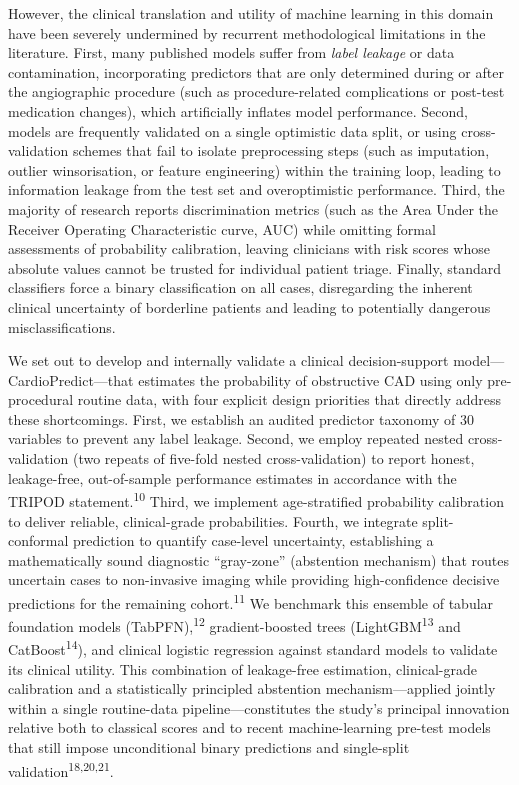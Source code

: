 \documentclass[
  english,
  11pt,
]{article}
\begin{document}
However, the clinical translation and utility of machine learning in this domain have been severely undermined by recurrent methodological limitations in the literature. First, many published models suffer from \emph{label leakage} or data contamination, incorporating predictors that are only determined during or after the angiographic procedure (such as procedure-related complications or post-test medication changes), which artificially inflates model performance. Second, models are frequently validated on a single optimistic data split, or using cross-validation schemes that fail to isolate preprocessing steps (such as imputation, outlier winsorisation, or feature engineering) within the training loop, leading to information leakage from the test set and overoptimistic performance. Third, the majority of research reports discrimination metrics (such as the Area Under the Receiver Operating Characteristic curve, AUC) while omitting formal assessments of probability calibration, leaving clinicians with risk scores whose absolute values cannot be trusted for individual patient triage. Finally, standard classifiers force a binary classification on all cases, disregarding the inherent clinical uncertainty of borderline patients and leading to potentially dangerous misclassifications.

We set out to develop and internally validate a clinical decision-support model---CardioPredict---that estimates the probability of obstructive CAD using only pre-procedural routine data, with four explicit design priorities that directly address these shortcomings. First, we establish an audited predictor taxonomy of 30 variables to prevent any label leakage. Second, we employ repeated nested cross-validation (two repeats of five-fold nested cross-validation) to report honest, leakage-free, out-of-sample performance estimates in accordance with the TRIPOD statement.\textsuperscript{10} Third, we implement age-stratified probability calibration to deliver reliable, clinical-grade probabilities. Fourth, we integrate split-conformal prediction to quantify case-level uncertainty, establishing a mathematically sound diagnostic ``gray-zone'' (abstention mechanism) that routes uncertain cases to non-invasive imaging while providing high-confidence decisive predictions for the remaining cohort.\textsuperscript{11} We benchmark this ensemble of tabular foundation models (TabPFN),\textsuperscript{12} gradient-boosted trees (LightGBM\textsuperscript{13} and CatBoost\textsuperscript{14}), and clinical logistic regression against standard models to validate its clinical utility. This combination of leakage-free estimation, clinical-grade calibration and a statistically principled abstention mechanism---applied jointly within a single routine-data pipeline---constitutes the study's principal innovation relative both to classical scores and to recent machine-learning pre-test models that still impose unconditional binary predictions and single-split validation\textsuperscript{18,20,21}.
\end{document}
